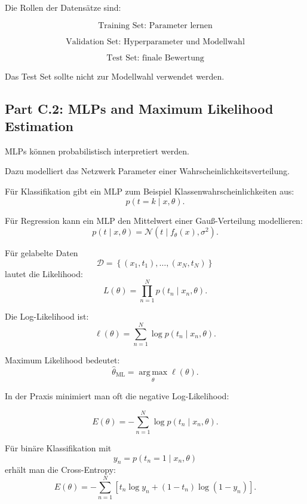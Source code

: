 \documentclass[11pt,a4paper]{scrartcl}
\newcommand{\set}[1]{\left\{ #1 \right\}}
\begin{document}
\begin{answerbox}
    Die Rollen der Datensätze sind:

    \[
        \boxed{
            \text{Training Set: Parameter lernen}
        }
    \]

    \[
        \boxed{
            \text{Validation Set: Hyperparameter und Modellwahl}
        }
    \]

    \[
        \boxed{
            \text{Test Set: finale Bewertung}
        }
    \]

    Das Test Set sollte nicht zur Modellwahl verwendet werden.
\end{answerbox}

\subsection{Part C.2: MLPs and Maximum Likelihood Estimation}

\begin{notebox}
    MLPs können probabilistisch interpretiert werden.

    Dazu modelliert das Netzwerk Parameter einer Wahrscheinlichkeitsverteilung.

    Für Klassifikation gibt ein MLP zum Beispiel Klassenwahrscheinlichkeiten aus:
    \[
        p(t=k \mid x,\theta).
    \]

    Für Regression kann ein MLP den Mittelwert einer Gauß-Verteilung modellieren:
    \[
        p(t \mid x,\theta)
        =
        \mathcal{N}(t \mid f_\theta(x),\sigma^2).
    \]
\end{notebox}

\begin{calculationbox}
    Für gelabelte Daten
    \[
        \mathcal{D}
        =
        \set{(x_1,t_1),\dots,(x_N,t_N)}
    \]
    lautet die Likelihood:
    \[
        L(\theta)
        =
        \prod_{n=1}^{N}
        p(t_n \mid x_n,\theta).
    \]

    Die Log-Likelihood ist:
    \[
        \ell(\theta)
        =
        \sum_{n=1}^{N}
        \log p(t_n \mid x_n,\theta).
    \]

    Maximum Likelihood bedeutet:
    \[
        \hat\theta_{\mathrm{ML}}
        =
        \operatorname*{arg\,max}_{\theta}
        \ell(\theta).
    \]
\end{calculationbox}

\begin{calculationbox}
    In der Praxis minimiert man oft die negative Log-Likelihood:

    \[
        E(\theta)
        =
        -
        \sum_{n=1}^{N}
        \log p(t_n \mid x_n,\theta).
    \]

    Für binäre Klassifikation mit
    \[
        y_n = p(t_n=1 \mid x_n,\theta)
    \]
    erhält man die Cross-Entropy:
    \[
        E(\theta)
        =
        -
        \sum_{n=1}^{N}
        \left[
            t_n\log y_n
            +
            (1-t_n)\log(1-y_n)
        \right].
    \]
\end{calculationbox}
\end{document}
